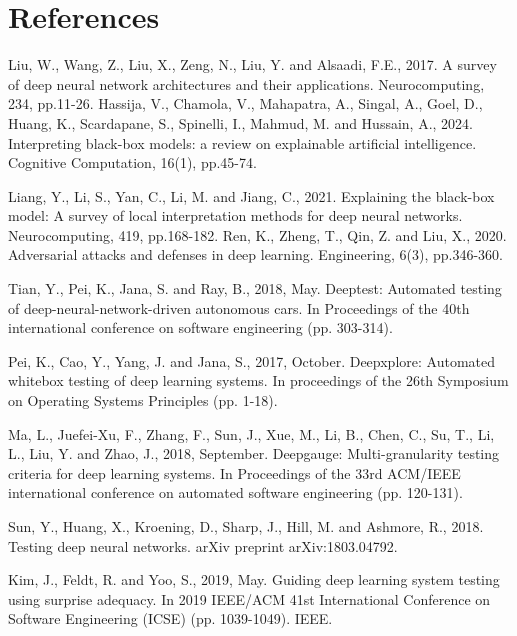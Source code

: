\chapter{References} %

\label{chp:5}
\begin{singlespace}
\begin{thebibliography}{}


    Liu, W., Wang, Z., Liu, X., Zeng, N., Liu, Y. and Alsaadi, F.E., 2017. A survey of deep neural network architectures and their applications. Neurocomputing, 234, pp.11-26.
    Hassija, V., Chamola, V., Mahapatra, A., Singal, A., Goel, D., Huang, K., Scardapane, S., Spinelli, I., Mahmud, M. and Hussain, A., 2024. Interpreting black-box models: a review on explainable artificial intelligence. Cognitive Computation, 16(1), pp.45-74.

     Liang, Y., Li, S., Yan, C., Li, M. and Jiang, C., 2021. Explaining the black-box model: A survey of local interpretation methods for deep neural networks. Neurocomputing, 419, pp.168-182.
    Ren, K., Zheng, T., Qin, Z. and Liu, X., 2020. Adversarial attacks and defenses in deep learning. Engineering, 6(3), pp.346-360.

    Tian, Y., Pei, K., Jana, S. and Ray, B., 2018, May. Deeptest: Automated testing of deep-neural-network-driven autonomous cars. In Proceedings of the 40th international conference on software engineering (pp. 303-314).
    
     Pei, K., Cao, Y., Yang, J. and Jana, S., 2017, October. Deepxplore: Automated whitebox testing of deep learning systems. In proceedings of the 26th Symposium on Operating Systems Principles (pp. 1-18).

    Ma, L., Juefei-Xu, F., Zhang, F., Sun, J., Xue, M., Li, B., Chen, C., Su, T., Li, L., Liu, Y. and Zhao, J., 2018, September. Deepgauge: Multi-granularity testing criteria for deep learning systems. In Proceedings of the 33rd ACM/IEEE international conference on automated software engineering (pp. 120-131).
    
    Sun, Y., Huang, X., Kroening, D., Sharp, J., Hill, M. and Ashmore, R., 2018. Testing deep neural networks. arXiv preprint arXiv:1803.04792.

    Kim, J., Feldt, R. and Yoo, S., 2019, May. Guiding deep learning system testing using surprise adequacy. In 2019 IEEE/ACM 41st International Conference on Software Engineering (ICSE) (pp. 1039-1049). IEEE.
  

\end{thebibliography}
\end{singlespace}
